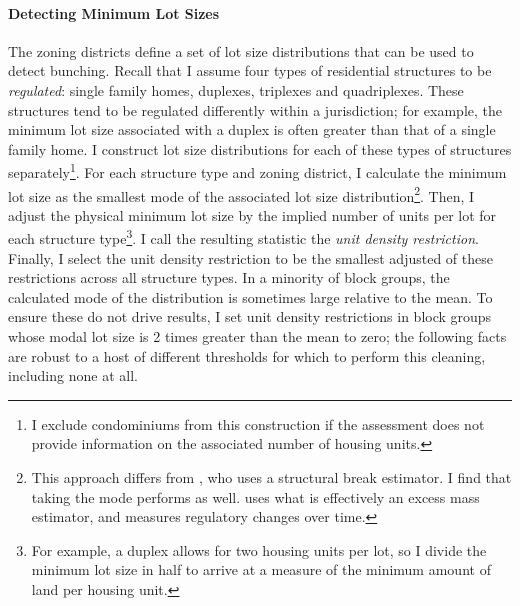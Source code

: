 \documentclass[12pt]{article}
\begin{document}
	 \paragraph*{Detecting Minimum Lot Sizes} The zoning districts define a set of lot size distributions that can be used to detect bunching. Recall that I assume four types of residential structures to be \textit{regulated}: single family homes, duplexes, triplexes and quadriplexes. These structures tend to be regulated differently within a jurisdiction; for example, the minimum lot size associated with a duplex is often greater than that of a single family home. I construct lot size distributions for each of these types of structures separately\footnote{I exclude condominiums from this construction if the assessment does not provide information on the associated number of housing units.}. For each structure type and zoning district, I calculate the minimum lot size as the smallest mode of the associated lot size distribution\footnote{This approach differs from \cite{Song}, who uses a structural break estimator. I find that taking the mode performs as well. \cite{Cui} uses what is effectively an excess mass estimator, and measures regulatory changes over time.}. Then, I adjust the physical minimum lot size by the implied number of units per lot for each structure type\footnote{For example, a duplex allows for two housing units per lot, so I divide the minimum lot size in half to arrive at a measure of the minimum amount of land per housing unit.}. I call the resulting statistic the \textit{unit density restriction}. Finally, I select the unit density restriction to be the smallest adjusted of these restrictions across all structure types. In a minority of block groups, the calculated mode of the distribution is sometimes large relative to the mean. To ensure these do not drive results, I set unit density restrictions in block groups whose modal lot size is 2 times greater than the mean to zero; the following facts are robust to a host of different thresholds for which to perform this cleaning, including none at all.
	 
\end{document}
